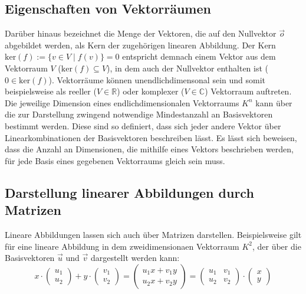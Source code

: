 \documentclass[]{dsadokumentation}
\begin{document}
\subsection{Eigenschaften von Vektorräumen}
Darüber hinaus bezeichnet die Menge der Vektoren, die auf den Nullvektor $\vec{o}$ abgebildet werden, als Kern der zugehörigen linearen Abbildung. Der Kern $\mathrm{ker}(f):= \{v \in V \; \big\vert \; f(v) \} = 0$ entspricht demnach einem Vektor aus dem Vektorraum $V$ ($\mathrm{ker}(f) \subseteq V$), in dem auch der Nullvektor enthalten ist ($0 \in \mathrm{ker}(f)$). Vektorräume können unendlichdimensonal sein und somit beispielsweise als reeller ($V \in \mathbb{R}$) oder komplexer ($V \in \mathbb{C}$) Vektorraum auftreten. Die jeweilige Dimension eines endlichdimensionalen Vektorraums $K^n$ kann über die zur Darstellung zwingend notwendige Mindestanzahl an Basisvektoren bestimmt werden. Diese sind so definiert, dass sich jeder andere Vektor über Linearkombinationen der Basisvektoren beschreiben lässt. Es lässt sich beweisen, dass die Anzahl an Dimensionen, die mithilfe eines Vektors beschrieben werden, für jede Basis eines gegebenen Vektorraums gleich sein muss.\\

\subsection{Darstellung linearer Abbildungen durch Matrizen}
Lineare Abbildungen lassen sich auch über Matrizen darstellen. Beispielsweise gilt für eine lineare Abbildung in dem zweidimensionaen Vektorraum $K^2$, der über die Basisvektoren $\vec{u}$ und $\vec{v}$ dargestellt werden kann:
\[x \cdot \left(\begin{array}{c} u_1 \\ u_2 \end{array}\right) + y \cdot \left(\begin{array}{c} v_1 \\ v_2 \end{array}\right) = \left(\begin{array}{c} u_1 x + v_1 y \\ u_2 x + v_2 y \end{array}\right) = \left( \begin{array}{rr} u_1 & v_1 \\ u_2 & v_2 \end{array}\right) \cdot \left(\begin{array}{c} x \\ y \end{array}\right) \]
\end{document}
